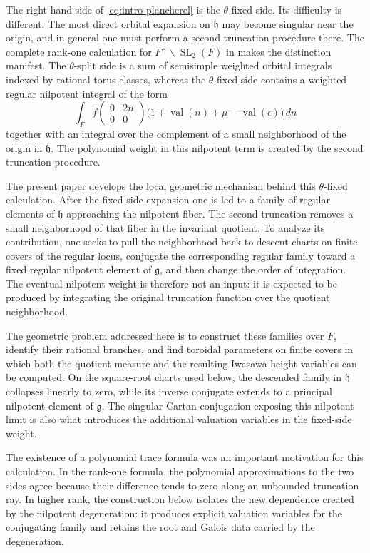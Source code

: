 \documentclass[11pt]{amsart}
\theoremstyle{definition}
\theoremstyle{remark}
\newcommand{\SL}{\operatorname{SL}}
\newcommand{\val}{\operatorname{val}}
\newcommand{\g}{\mathfrak g}
\newcommand{\h}{\mathfrak h}
\begin{document}
The right-hand side of \eqref{eq:intro-plancherel} is the $\theta$-fixed
side.  Its difficulty is different.  The most direct orbital expansion on
$\h$ may become singular near the origin, and in general one must perform a second
truncation procedure there.  The complete rank-one calculation for
$F^\times\backslash\SL_2(F)$ in \cite{SparlingRankOne} makes the
distinction manifest.  The $\theta$-split side is a sum of semisimple
weighted orbital integrals indexed by rational torus classes, whereas the
$\theta$-fixed side contains a weighted regular nilpotent integral of the
form
\[
 \int_F \widetilde f
 \begin{pmatrix}0&2n\\0&0\end{pmatrix}
 \bigl(1+\val(n)+\mu-\val(\epsilon)\bigr)\,dn
\]
together with an integral over the complement of a small neighborhood of the
origin in $\h$.  The polynomial weight in this nilpotent term is created by
the second truncation procedure.

The present paper develops the local geometric mechanism behind this
$\theta$-fixed calculation.  After the fixed-side expansion one is led to a
family of regular elements of $\h$ approaching the nilpotent fiber.  The
second truncation removes a small neighborhood of that fiber in the invariant
quotient.  To analyze its contribution, one seeks to pull the neighborhood
back to descent charts on finite covers of the regular locus, conjugate the
corresponding regular family toward a fixed regular nilpotent element of
$\g$, and then change the order of integration.  The eventual nilpotent
weight is therefore not an input: it is expected to be produced by
integrating the original truncation function over the quotient neighborhood.

The geometric problem addressed here is to construct these families over
$F$, identify their rational branches, and find toroidal parameters on finite
covers in which both the quotient measure and the resulting Iwasawa-height
variables can be computed.
On the square-root charts used below, the descended family in $\h$ collapses
linearly to zero, while its inverse conjugate extends to a principal nilpotent
element of $\g$.  The singular Cartan conjugation exposing this nilpotent limit
is also what introduces the additional valuation variables in the fixed-side
weight.

The existence of a polynomial trace formula was an important motivation for
this calculation.  In the rank-one formula, the polynomial approximations to
the two sides agree because their difference tends to zero along an
unbounded truncation ray.  In higher rank, the construction below isolates
the new dependence created by the nilpotent degeneration: it produces
explicit valuation variables for the conjugating family and retains the root
and Galois data carried by the degeneration.
\end{document}
